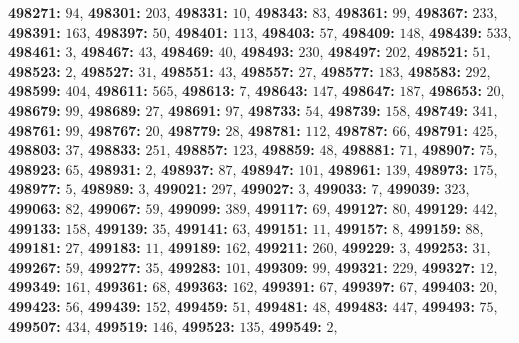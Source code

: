 \textsf{\bfseries 498271:} $94$, \textsf{\bfseries 498301:} $203$, \textsf{\bfseries 498331:} $10$, \textsf{\bfseries 498343:} $83$, \textsf{\bfseries 498361:} $99$, \textsf{\bfseries 498367:} $233$, \textsf{\bfseries 498391:} $163$, \textsf{\bfseries 498397:} $50$, \textsf{\bfseries 498401:} $113$, \textsf{\bfseries 498403:} $57$, \textsf{\bfseries 498409:} $148$, \textsf{\bfseries 498439:} $533$, \textsf{\bfseries 498461:} $3$, \textsf{\bfseries 498467:} $43$, \textsf{\bfseries 498469:} $40$, \textsf{\bfseries 498493:} $230$, \textsf{\bfseries 498497:} $202$, \textsf{\bfseries 498521:} $51$, \textsf{\bfseries 498523:} $2$, \textsf{\bfseries 498527:} $31$, \textsf{\bfseries 498551:} $43$, \textsf{\bfseries 498557:} $27$, \textsf{\bfseries 498577:} $183$, \textsf{\bfseries 498583:} $292$, \textsf{\bfseries 498599:} $404$, \textsf{\bfseries 498611:} $565$, \textsf{\bfseries 498613:} $7$, \textsf{\bfseries 498643:} $147$, \textsf{\bfseries 498647:} $187$, \textsf{\bfseries 498653:} $20$, \textsf{\bfseries 498679:} $99$, \textsf{\bfseries 498689:} $27$, \textsf{\bfseries 498691:} $97$, \textsf{\bfseries 498733:} $54$, \textsf{\bfseries 498739:} $158$, \textsf{\bfseries 498749:} $341$, \textsf{\bfseries 498761:} $99$, \textsf{\bfseries 498767:} $20$, \textsf{\bfseries 498779:} $28$, \textsf{\bfseries 498781:} $112$, \textsf{\bfseries 498787:} $66$, \textsf{\bfseries 498791:} $425$, \textsf{\bfseries 498803:} $37$, \textsf{\bfseries 498833:} $251$, \textsf{\bfseries 498857:} $123$, \textsf{\bfseries 498859:} $48$, \textsf{\bfseries 498881:} $71$, \textsf{\bfseries 498907:} $75$, \textsf{\bfseries 498923:} $65$, \textsf{\bfseries 498931:} $2$, \textsf{\bfseries 498937:} $87$, \textsf{\bfseries 498947:} $101$, \textsf{\bfseries 498961:} $139$, \textsf{\bfseries 498973:} $175$, \textsf{\bfseries 498977:} $5$, \textsf{\bfseries 498989:} $3$, \textsf{\bfseries 499021:} $297$, \textsf{\bfseries 499027:} $3$, \textsf{\bfseries 499033:} $7$, \textsf{\bfseries 499039:} $323$, \textsf{\bfseries 499063:} $82$, \textsf{\bfseries 499067:} $59$, \textsf{\bfseries 499099:} $389$, \textsf{\bfseries 499117:} $69$, \textsf{\bfseries 499127:} $80$, \textsf{\bfseries 499129:} $442$, \textsf{\bfseries 499133:} $158$, \textsf{\bfseries 499139:} $35$, \textsf{\bfseries 499141:} $63$, \textsf{\bfseries 499151:} $11$, \textsf{\bfseries 499157:} $8$, \textsf{\bfseries 499159:} $88$, \textsf{\bfseries 499181:} $27$, \textsf{\bfseries 499183:} $11$, \textsf{\bfseries 499189:} $162$, \textsf{\bfseries 499211:} $260$, \textsf{\bfseries 499229:} $3$, \textsf{\bfseries 499253:} $31$, \textsf{\bfseries 499267:} $59$, \textsf{\bfseries 499277:} $35$, \textsf{\bfseries 499283:} $101$, \textsf{\bfseries 499309:} $99$, \textsf{\bfseries 499321:} $229$, \textsf{\bfseries 499327:} $12$, \textsf{\bfseries 499349:} $161$, \textsf{\bfseries 499361:} $68$, \textsf{\bfseries 499363:} $162$, \textsf{\bfseries 499391:} $67$, \textsf{\bfseries 499397:} $67$, \textsf{\bfseries 499403:} $20$, \textsf{\bfseries 499423:} $56$, \textsf{\bfseries 499439:} $152$, \textsf{\bfseries 499459:} $51$, \textsf{\bfseries 499481:} $48$, \textsf{\bfseries 499483:} $447$, \textsf{\bfseries 499493:} $75$, \textsf{\bfseries 499507:} $434$, \textsf{\bfseries 499519:} $146$, \textsf{\bfseries 499523:} $135$, \textsf{\bfseries 499549:} $2$, 
